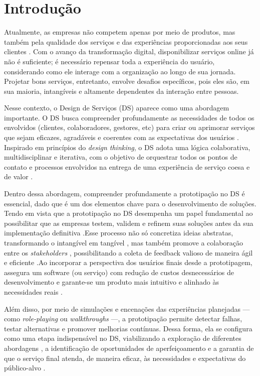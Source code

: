 \chapter[Introdução]{Introdução}


Atualmente, as empresas não competem apenas por meio de produtos, mas também pela qualidade dos serviços e das experiências proporcionadas aos seus clientes \cite{PineGilmore1999MuseumNews}. Com o avanço da transformação digital, disponibilizar serviços online já não é suficiente; é necessário repensar toda a experiência do usuário, considerando como ele interage com a organização ao longo de sua jornada. Projetar bons serviços, entretanto, envolve desafios específicos, pois eles são, em sua maioria, intangíveis e altamente dependentes da interação entre pessoas.

Nesse contexto, o Design de Serviços (DS) aparece como uma abordagem importante. O DS busca compreender profundamente as necessidades de todos os envolvidos (clientes, colaboradores, gestores, etc) para criar ou aprimorar serviços que sejam eficazes, agradáveis e coerentes com as expectativas dos usuários \cite{Stickdorn2019}. Inspirado em princípios do  \textit{design thinking}, o DS adota uma lógica colaborativa, multidisciplinar e iterativa, com o objetivo de orquestrar todos os pontos de contato e processos envolvidos na entrega de uma experiência de serviço coesa e de valor \cite{Polaine2013Orange, Mager2009Emerging}.

Dentro dessa abordagem, compreender profundamente a prototipação no DS é essencial, dado que é um dos elementos chave para o desenvolvimento de soluções. Tendo em vista que a prototipação no DS desempenha um papel fundamental ao possibilitar que as empresas testem, validem e refinem suas soluções antes da sua implementação definitiva \cite{paust2025integrative}.Esse processo não só concretiza ideias abstratas, transformando o intangível em tangível \cite{soto2023prototyping, mager2023product}, mas também promove a colaboração entre os \textit{stakeholders} \cite{paust2025integrative}, possibilitando a coleta de feedback valioso de maneira ágil e eficiente \cite{asbjornsen2022echange}.Ao incorporar a perspectiva dos usuários finais desde a prototipagem, assegura um software (ou serviço) com redução de custos desnecessários de desenvolvimento e garante-se um produto mais intuitivo e alinhado às necessidades reais \cite{Mattjus2023, villa2022integratedcare}.

Além disso, por meio de simulações e encenações das experiências planejadas — como \textit{role-playing} ou \textit{walkthroughs} \cite{seko2024transitions, soto2023prototyping} —, a prototipação permite detectar falhas, testar alternativas e promover melhorias contínuas. Dessa forma, ela se configura como uma etapa indispensável no DS, viabilizando a exploração de diferentes abordagens \cite{paust2025integrative}, a identificação de oportunidades de aperfeiçoamento e a garantia de que o serviço final atenda, de maneira eficaz, às necessidades e expectativas do público-alvo \cite{kumar2023rheumatology}.


